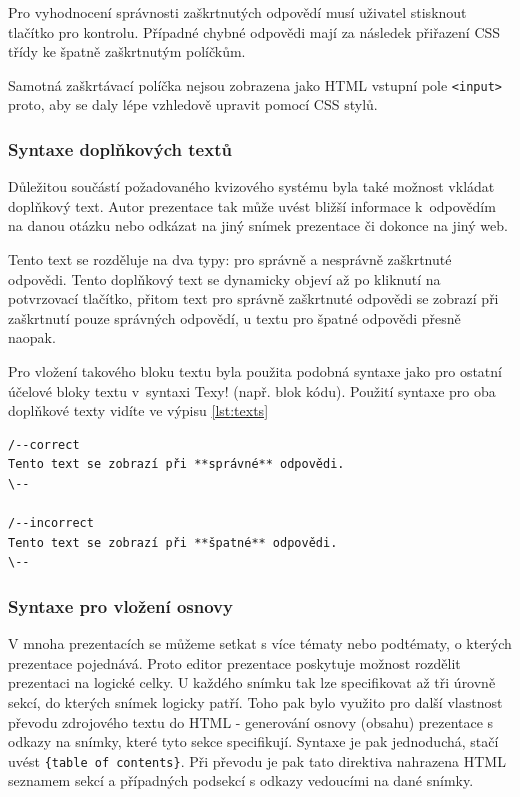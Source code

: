 \documentclass[11pt,twoside,a4paper]{book}
\begin{document}
Pro vyhodnocení správnosti zaškrtnutých odpovědí musí uživatel stisknout tlačítko pro kontrolu. Případné chybné odpovědi mají za následek přiřazení CSS třídy ke špatně zaškrtnutým políčkům.

Samotná zaškrtávací políčka nejsou zobrazena jako HTML vstupní pole \verb|<input>| proto, aby se daly lépe vzhledově upravit pomocí CSS stylů.

\subsubsection{Syntaxe doplňkových textů}
Důležitou součástí požadovaného kvizového systému byla také možnost vkládat doplňkový text. Autor prezentace tak může uvést bližší informace k~odpovědím na danou otázku nebo odkázat na jiný snímek prezentace či dokonce na jiný web.

Tento text se rozděluje na dva typy: pro správně a nesprávně zaškrtnuté odpovědi. Tento doplňkový text se dynamicky objeví až po kliknutí na potvrzovací tlačítko, přitom text pro správně zaškrtnuté odpovědi se zobrazí při zaškrtnutí pouze správných odpovědí, u textu pro špatné odpovědi přesně naopak.

Pro vložení takového bloku textu byla použita podobná syntaxe jako pro ostatní účelové bloky textu v~syntaxi Texy!
(např. blok kódu). Použití syntaxe pro oba doplňkové texty vidíte ve výpisu \ref{lst:texts}

\begin{lstlisting}[caption={Syntaxe doplňkových textů},label={lst:texts}]
/--correct
Tento text se zobrazí při **správné** odpovědi.
\--

/--incorrect
Tento text se zobrazí při **špatné** odpovědi.
\--
\end{lstlisting}

\subsubsection{Syntaxe pro vložení osnovy}
V mnoha prezentacích se můžeme setkat s více tématy nebo podtématy, o kterých prezentace pojednává. Proto editor prezentace poskytuje možnost rozdělit prezentaci na logické celky. U každého snímku tak lze specifikovat až tři úrovně sekcí, do kterých snímek logicky patří. Toho pak bylo využito pro další vlastnost převodu zdrojového textu do HTML - generování osnovy (obsahu) prezentace s odkazy na snímky, které tyto sekce specifikují. Syntaxe je pak jednoduchá, stačí uvést \verb|{table of contents}|. Při převodu je pak tato direktiva nahrazena HTML seznamem sekcí a případných podsekcí s odkazy vedoucími na dané snímky.
\end{document}

